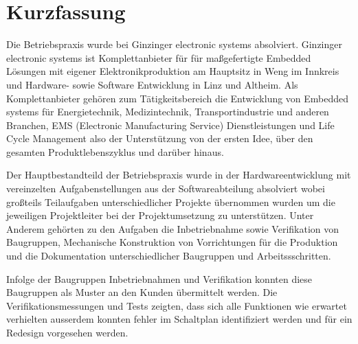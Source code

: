 \documentclass[praktikum,german]{hgbthesis}
\begin{document}


\author{Jakob Moser}


\frontmatter
\maketitle
\tableofcontents

\chapter{Kurzfassung}

Die Betriebspraxis wurde bei Ginzinger electronic systems absolviert. 
Ginzinger electronic systems ist Komplettanbieter für für maßgefertigte Embedded Lösungen mit 
eigener Elektronikproduktion am Hauptsitz in Weng im Innkreis und Hardware- sowie Software 
Entwicklung in Linz und Altheim. Als Komplettanbieter gehören zum Tätigkeitsbereich
die Entwicklung von Embedded systems für Energietechnik, Medizintechnik, 
Transportindustrie und anderen Branchen, EMS (Electronic Manufacturing Service) Dienstleistungen und Life Cycle Management 
also der Unterstützung von der ersten Idee, über den gesamten Produktlebenszyklus und darüber hinaus.

Der Hauptbestandteild der Betriebspraxis wurde in der Hardwareentwicklung mit vereinzelten Aufgabenstellungen 
aus der Softwareabteilung absolviert wobei großteils Teilaufgaben unterschiedlicher Projekte übernommen wurden um 
die jeweiligen Projektleiter bei der Projektumsetzung zu unterstützen. Unter Anderem gehörten zu den Aufgaben 
die Inbetriebnahme sowie Verifikation von Baugruppen, Mechanische Konstruktion von Vorrichtungen für die 
Produktion und die Dokumentation unterschiedlicher 
Baugruppen und Arbeitssschritten. 

Infolge der Baugruppen Inbetriebnahmen und Verifikation konnten diese Baugruppen 
als Muster an den Kunden übermittelt werden. Die Verifikationsmessungen und Tests
zeigten, dass sich alle Funktionen wie erwartet verhielten ausserdem konnten fehler 
im Schaltplan identifiziert werden und für ein Redesign vorgesehen werden.
\end{document}
